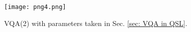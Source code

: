 \documentclass[conference,compsoc, 10pt]{IEEEtran}
\begin{document}
	
	\begin{figure}
	\texttt{[image: png4.png]}
		\caption{VQA(2) with parameters taken in Sec. \ref{sec: VQA in QSL}.}
		\label{fig VQA2}
	\end{figure}
	
       {\vskip 3pt}
	
\end{document}
